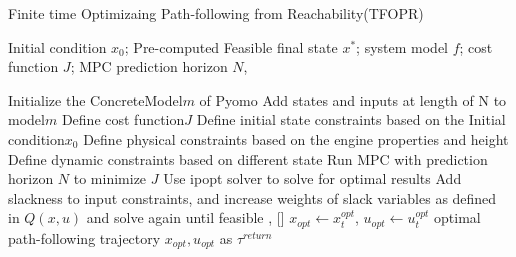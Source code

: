 \begin{algorithm}[t!]
    \caption{Finite time Optimizaing Path-following from Reachability(TFOPR)}
    \begin{algorithmic}[1]
    \label{alg:the_alg}
    \REQUIRE Initial condition $x_{0}$; Pre-computed Feasible final state $x^*$; system model $f$; cost function $J$; MPC prediction horizon $N$,
    
    \STATE Initialize the ConcreteModel$m$ of Pyomo
    \STATE Add states and inputs at length of N to model$m$ 
    \STATE Define cost function$J$
    \STATE Define initial state constraints based on the Initial condition$x_{0}$
    \STATE Define physical constraints based on the engine properties and height 
    \STATE Define dynamic constraints based on different state 
    \STATE Run MPC with prediction horizon $N$ to minimize $J$
    \STATE Use ipopt solver to solve for optimal results
        \STATE Add slackness to input constraints, and increase weights of slack variables as defined in $Q(x,u)$ and solve again until feasible
        \RETURN [], []
    \ENDIF
    \STATE $x_{opt} \gets x^{opt}_t$, $u_{opt} \gets u^{opt}_t$
    \RETURN optimal path-following trajectory $x_{opt}, u_{opt}$ as $\tau^{return}$
    \end{algorithmic}
\end{algorithm}